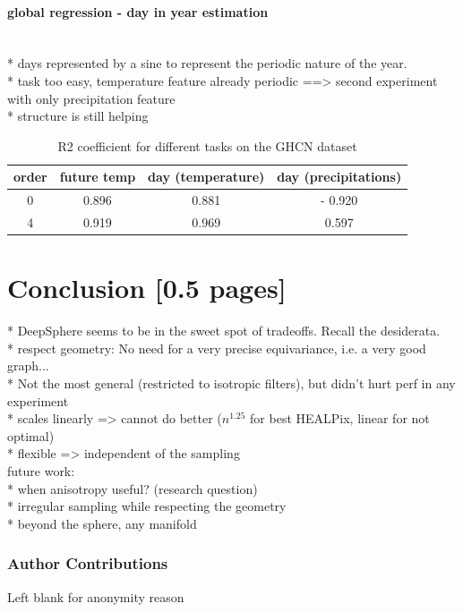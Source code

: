 \documentclass{article} %
\begin{document}
\paragraph*{global regression - day in year estimation}~\\
* days represented by a sine to represent the periodic nature of the year.\\
* task too easy, temperature feature already periodic ==> second experiment with only precipitation feature\\
* structure is still helping\\

\begin{table}[!ht]
    \centering
    \begin{tabular}{c|ccc}
        order & future temp & day (temperature) & day (precipitations) \\ \hline 
        0 & 0.896 & 0.881 & - 0.920\\
        4 & 0.919 & 0.969 & 0.597\\
    \end{tabular}
    \caption{R2 coefficient for different tasks on the GHCN dataset}
    \label{tab:GHCN_results}
\end{table}



\section{Conclusion [0.5 pages]}

* DeepSphere seems to be in the sweet spot of tradeoffs. Recall the desiderata.\\
  * respect geometry: No need for a very precise equivariance, i.e. a very good graph...\\
  * Not the most general (restricted to isotropic filters), but didn't hurt perf in any experiment\\
  * scales linearly => cannot do better ($n^{1.25}$ for best HEALPix, linear for not optimal)\\
  * flexible => independent of the sampling\\

future work:\\
* when anisotropy useful? (research question)\\
* irregular sampling while respecting the geometry\\
* beyond the sphere, any manifold\\

\newpage
\subsubsection*{Author Contributions}
Left blank for anonymity reason
\end{document}
